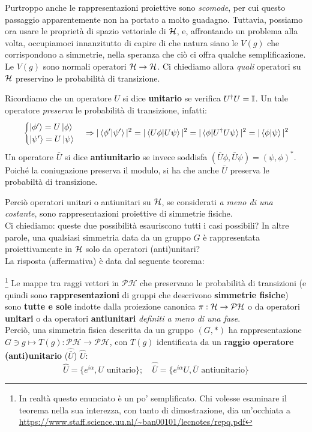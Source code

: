 \documentclass[../../FisicaTeorica.tex]{subfiles}
\begin{document}
Purtroppo anche le rappresentazioni proiettive sono \textit{scomode}, per cui questo passaggio apparentemente non ha portato a molto guadagno. Tuttavia, possiamo ora usare le proprietà di spazio vettoriale di $\mathcal{H}$, e, affrontando un problema alla volta, occupiamoci innanzitutto di capire di che natura siano le $V(g)$ che corrispondono a simmetrie, nella speranza che ciò ci offra qualche semplificazione.\\
Le $V(g)$ sono normali operatori $\mathcal{H}\to\mathcal{H}$. Ci chiediamo allora \textit{quali} operatori su $\mathcal{H}$ preservino le probabilità di transizione.
\begin{dfn}
Ricordiamo che un operatore $U$ si dice \textbf{unitario} se verifica $U^\dag U = \mathbb{I}$. Un tale operatore \textit{preserva} le probabilità di transizione, infatti:
\[
\begin{cases}
\ket{\phi'}=U\ket{\phi}\\
\ket{\psi'}=U\ket{\psi}
\end{cases}\Rightarrow |\braket{\phi'|\psi'}|^2=|\braket{U\phi|U\psi}|^2=|\braket{\phi|U^\dag U \psi}|^2 =|\braket{\phi|\psi}|^2
\]
Un operatore $\bar{U}$ si dice \textbf{antiunitario} se invece soddisfa $(\bar{U}\phi,\bar{U}\psi)=(\psi,\phi)^*$. Poiché la coniugazione preserva il modulo, si ha che anche $\bar{U}$ preserva le probabiltà di transizione.
\end{dfn}

Perciò operatori unitari o antiunitari su $\mathcal{H}$, se considerati \textit{a meno di una costante}, sono rappresentazioni proiettive di simmetrie fisiche.\\
Ci chiediamo: queste due possibilità esauriscono tutti i casi possibili? In altre parole, una qualsiasi simmetria data da un gruppo $G$ è rappresentata proiettivamente in $\mathcal{H}$ solo da operatori (anti)unitari?\\
La risposta (affermativa) è data dal seguente teorema:

\begin{thm}\footnote{In realtà questo enunciato è un po' semplificato. Chi volesse esaminare il teorema nella sua interezza, con tanto di dimostrazione, dia un'occhiata a \url{https://www.staff.science.uu.nl/~ban00101/lecnotes/repq.pdf}}
Le mappe tra raggi vettori in $\mathcal{PH}$ che preservano le probabilità di transizioni (e quindi sono \textbf{rappresentazioni} di gruppi che descrivono \textbf{simmetrie fisiche}) sono \textbf{tutte e sole} indotte dalla proiezione canonica $\pi:\mathcal{H} \to \mathcal{PH}$ o da operatori \textbf{unitari} o da operatori \textbf{antiunitari} \textit{definiti a meno di una fase}.\\
Perciò, una simmetria fisica descritta da un gruppo $(G,*)$ ha rappresentazione $G \ni g \mapsto T(g):\mathcal{PH} \to \mathcal{PH}$, con $T(g)$ identificata da un \textbf{raggio operatore (anti)unitario} ($\hat{\bar{U}}$) $\hat{U}$:
\[
\hat{U}=\{e^{i\alpha}, U \text{ unitario}\}; \quad \hat{\bar{U}}=\{e^{i\alpha} U, \bar{U} \text{ antiunitario}\} 
\]  
\end{thm}
\end{document}
